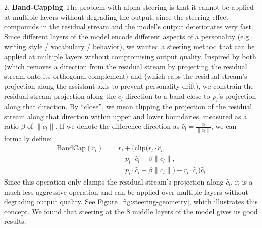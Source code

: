 2. \textbf{Band-Capping} The problem with alpha steering is that it cannot be applied at multiple layers without degrading the output, since the steering effect compounds in the residual stream and the model's output deteriorates very fast. Since different layers of the model encode different aspects of a personality (e.g., writing style / vocabulary / behavior), we wanted a steering method that can be applied at multiple layers without compromising output quality. Inspired by both \citet{arditi2024refusal} (which removes a direction from the residual stream by projecting the residual stream onto its orthogonal complement) and \citet{lu2026assistant} (which caps the residual stream's projection along the assistant axis to prevent personality drift), we constrain the residual stream projection along the ${c}_l$ direction to a band close to $p_l$'s projection along that direction. By ``close'', we mean clipping the projection of the residual stream along that direction within upper and lower boundaries, measured as a ratio $\beta$ of $\lVert {c}_l \rVert$. If we denote the difference direction as $\hat{c}_l = \frac{{c}_l}{\lVert {c}_l \rVert}$, we can formally define:
\begin{equation*}
\begin{split}
\mathrm{BandCap}(r_l) = {}& r_l + \bigl(\mathrm{clip}(r_l \cdot \hat{c}_l, \\
& \quad p_l \cdot \hat{c}_l - \beta \lVert c_l \rVert, \\
& \quad p_l \cdot \hat{c}_l + \beta \lVert c_l \rVert) - r_l \cdot \hat{c}_l\bigr)\hat{c}_l
\end{split}
\end{equation*}
Since this operation only clamps the residual stream's projection along $\hat{c}_l$, it is a much less aggressive operation and can be applied over multiple layers without degrading output quality. See Figure~\ref{fig:steering-geometry}, which illustrates this concept. We found that steering at the 8 middle layers of the model gives us good results.


